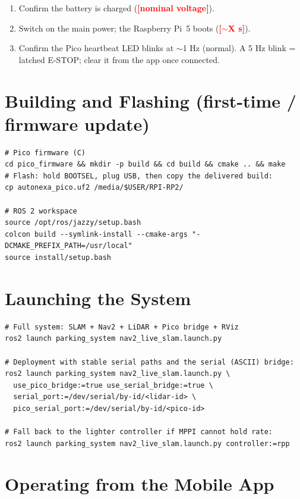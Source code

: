\documentclass[12pt,a4paper]{report}
\newcommand{\TODO}[1]{\textcolor{red}{\textbf{[#1]}}}
\begin{document}
\begin{appendices}
\begin{enumerate}[leftmargin=1.4cm]
    \item Confirm the battery is charged (\TODO{nominal voltage}).
    \item Switch on the main power; the Raspberry Pi~5 boots (\TODO{$\sim$X s}).
    \item Confirm the Pico heartbeat LED blinks at $\sim$1 Hz (normal). A 5 Hz
          blink = latched E-STOP; clear it from the app once connected.
\end{enumerate}

\section{Building and Flashing (first-time / firmware update)}

\begin{lstlisting}
# Pico firmware (C)
cd pico_firmware && mkdir -p build && cd build && cmake .. && make
# Flash: hold BOOTSEL, plug USB, then copy the delivered build:
cp autonexa_pico.uf2 /media/$USER/RPI-RP2/

# ROS 2 workspace
source /opt/ros/jazzy/setup.bash
colcon build --symlink-install --cmake-args "-DCMAKE_PREFIX_PATH=/usr/local"
source install/setup.bash
\end{lstlisting}

\section{Launching the System}

\begin{lstlisting}
# Full system: SLAM + Nav2 + LiDAR + Pico bridge + RViz
ros2 launch parking_system nav2_live_slam.launch.py

# Deployment with stable serial paths and the serial (ASCII) bridge:
ros2 launch parking_system nav2_live_slam.launch.py \
  use_pico_bridge:=true use_serial_bridge:=true \
  serial_port:=/dev/serial/by-id/<lidar-id> \
  pico_serial_port:=/dev/serial/by-id/<pico-id>

# Fall back to the lighter controller if MPPI cannot hold rate:
ros2 launch parking_system nav2_live_slam.launch.py controller:=rpp
\end{lstlisting}

\section{Operating from the Mobile App}


\end{appendices}
\end{document}
